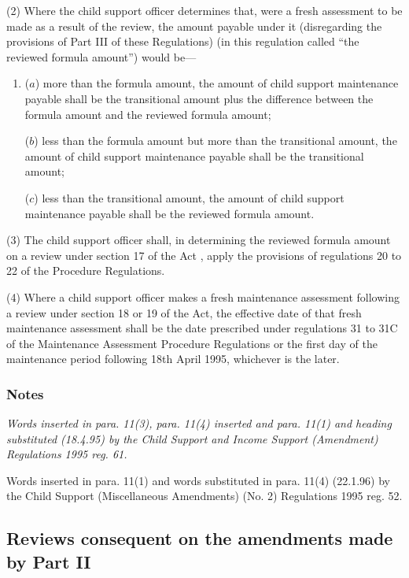 \documentclass[a4paper]{article}
\newcommand\amendment[1]{\subsubsection*{Notes}{\itshape\frenchspacing\footnotesize #1 \par}}
\begin{document}
(2) Where the child support officer determines that, were a fresh assessment to be made as a result of the review, the amount payable under it (disregarding the provisions of Part III of these Regulations) (in this regulation called “the reviewed formula amount”) would be—
\begin{enumerate}\item[]
($a$) more than the formula amount, the amount of child support maintenance payable shall be the transitional amount plus the difference between the formula amount and the reviewed formula amount;

($b$) less than the formula amount but more than the transitional amount, the amount of child support maintenance payable shall be the transitional amount;

($c$) less than the transitional amount, the amount of child support maintenance payable shall be the reviewed formula amount.
\end{enumerate}

(3) The child support officer shall, in determining the reviewed formula amount
on a review under section 17 of the Act%
, apply the provisions of regulations 20 to 22 of the Procedure Regulations.

(4) Where a child support officer makes a fresh maintenance assessment following a review under section 18 or 19 of the Act, the effective date of that fresh maintenance assessment shall be the date prescribed under 
regulations 31 to 31C  %
of the Maintenance Assessment Procedure Regulations or the first day of the maintenance period following 18th April 1995, whichever is the later.

\amendment{
Words inserted in para. 11(3), para. 11(4) inserted and para. 11(1) and heading substituted (18.4.95) by the Child Support and Income Support (Amendment) Regulations 1995 reg. 61.

Words inserted in para. 11(1) and words substituted in para. 11(4) (22.1.96) by the Child Support (Miscellaneous Amendments) (No. 2) Regulations 1995 reg. 52.
}

\subsection[12. Reviews consequent on the amendments made by Part II]{Reviews consequent on the amendments made by Part II}
\end{document}
